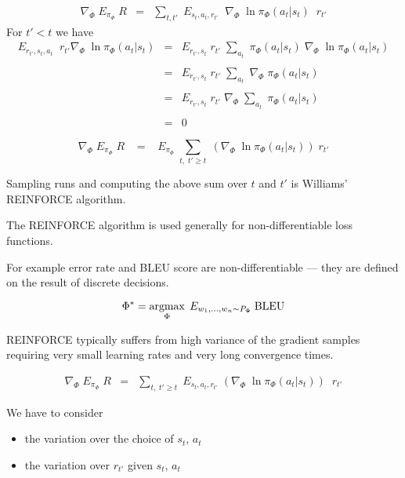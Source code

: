 {

\begin{eqnarray*}
    \nabla_\Phi \; E_{\pi_\Phi}\; R  & = & \sum_{t,t'}\;E_{s_t,a_t,r_{t'}}\;\; \nabla_\Phi\;\ln \pi_\Phi(a_{t}|s_{t})\;\;r_{t'}
    \end{eqnarray*}
For $t' < t$ we have
{\huge
\begin{eqnarray*}
    E_{r_{t'},s_t,a_t}\;\; r_{t'} \nabla_\Phi\;\ln \pi_\Phi(a_t|s_t)  & =  & E_{r_{t'},s_t}\; r_{t'}  \;\sum_{a_t} \; \pi_\Phi(a_t|s_t)\; \nabla_\Phi\;\ln \pi_\Phi(a_t|s_t) \\
    \\
    & =  & E_{r_{t'},s_t}\; r_{t'}  \;\sum_{a_t}\; \nabla_\Phi\; \pi_\Phi(a_t|s_t) \\
    \\
    & =  & E_{r_{t'},s_t}\; r_{t'}  \;\nabla_\Phi\; \sum_{a_t}\;\pi_\Phi(a_t|s_t) \\
    \\
    & = & 0
\end{eqnarray*}
}

$$\nabla_\Phi \;E_{\pi_\Phi}\;R \;\;\; = \;\;\; E_{\pi_\Phi}\; \sum_{t,\;t' \geq t} \; \left(\nabla_\Phi\;\ln \pi_\Phi(a_t|s_t)\right) \;r_{t'}$$

\vfill
Sampling runs and computing the above sum over $t$ and $t'$ is Williams' REINFORCE algorithm.


The REINFORCE algorithm is used generally for non-differentiable loss functions.

\vfill
For example error rate and BLEU score are non-differentiable --- they are defined on the result of discrete decisions.

\vfill
$$\Phi^* = \operatorname*{argmax}_\Phi \;E_{w_1,\ldots,w_n \sim P_\Phi}\;\mathrm{BLEU}$$


REINFORCE typically suffers from high variance of the gradient samples requiring very small learning rates and very long convergence times.

\begin{eqnarray*}
    \nabla_\Phi \; E_{\pi_\Phi}\; R  & = & \sum_{t,\;t'\geq t}\; E_{s_t,a_t,r_{t'}}\; \left(\nabla_\Phi\;\ln \pi_\Phi(a_{t}|s_{t})\right)\;\;r_{t'}
\end{eqnarray*}

\vfill
We have to consider
\begin{itemize}
\item {\color{red} the variation over the choice of $s_t$, $a_t$}
\item {\color{red} the variation over $r_{t'}$ given $s_t$, $a_t$}
\end{itemize}

}
